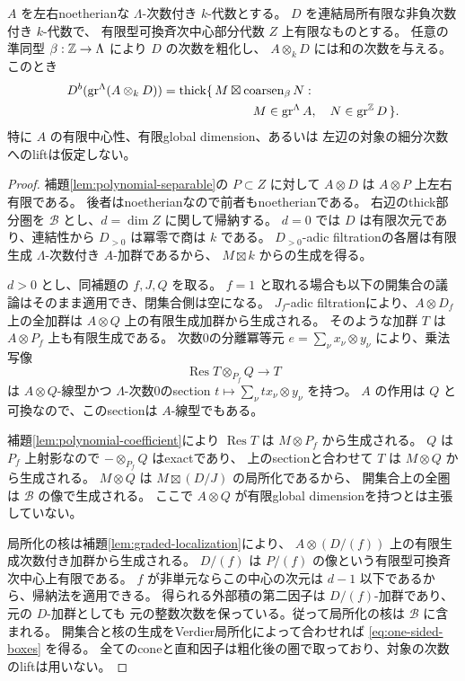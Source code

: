 \begin{theorem}[一方だけが有限中心である外部積生成]\label{thm:one-sided-boxes}
 \(A\) を左右noetherianな \(\Lambda\)-次数付き \(k\)-代数とする。
 \(D\) を連結局所有限な非負次数付き \(k\)-代数で、
 有限型可換斉次中心部分代数 \(Z\) 上有限なものとする。
 任意の準同型 \(\beta:\mathbb Z\to\Lambda\) により \(D\) の次数を粗化し、
 \(A\otimes_kD\) には和の次数を与える。このとき
 \begin{equation}\label{eq:one-sided-boxes}
 \begin{split}
 D^b(\operatorname{gr}^{\Lambda}(A\otimes_kD))
 =\operatorname{thick}\{\,M\boxtimes\operatorname{coarsen}_\beta N:\qquad\qquad\qquad\quad\\
 M\in\operatorname{gr}^{\Lambda}A,\quad
 N\in\operatorname{gr}^{\mathbb Z}D\,\}.
 \end{split}
 \end{equation}
 特に \(A\) の有限中心性、有限global dimension、あるいは
 左辺の対象の細分次数へのliftは仮定しない。
\end{theorem}
\begin{proof}
 補題\ref{lem:polynomial-separable}の \(P\subset Z\) に対して
 \(A\otimes D\) は \(A\otimes P\) 上左右有限である。
 後者はnoetherianなので前者もnoetherianである。
 右辺のthick部分圏を \(\mathcal B\) とし、\(d=\dim Z\) に関して帰納する。
 \(d=0\) では \(D\) は有限次元であり、連結性から \(D_{>0}\) は冪零で商は \(k\) である。
 \(D_{>0}\)-adic filtrationの各層は有限生成 \(\Lambda\)-次数付き \(A\)-加群であるから、
 \(M\boxtimes k\) からの生成を得る。

 \(d>0\) とし、同補題の \(f,J,Q\) を取る。
 \(f=1\) と取れる場合も以下の開集合の議論はそのまま適用でき、閉集合側は空になる。
 \(J_f\)-adic filtrationにより、\(A\otimes D_f\) 上の全加群は
 \(A\otimes Q\) 上の有限生成加群から生成される。
 そのような加群 \(T\) は \(A\otimes P_f\) 上も有限生成である。
 次数0の分離冪等元 \(e=\sum_\nu x_\nu\otimes y_\nu\) により、乗法写像
 \[
 \operatorname{Res}T\otimes_{P_f}Q\longrightarrow T
 \]
 は \(A\otimes Q\)-線型かつ \(\Lambda\)-次数0のsection
 \(t\mapsto\sum_\nu tx_\nu\otimes y_\nu\) を持つ。
 \(A\) の作用は \(Q\) と可換なので、このsectionは \(A\)-線型でもある。

 補題\ref{lem:polynomial-coefficient}により \(\operatorname{Res}T\) は
 \(M\otimes P_f\) から生成される。
 \(Q\) は \(P_f\) 上射影なので \(-\otimes_{P_f}Q\) はexactであり、
 上のsectionと合わせて \(T\) は \(M\otimes Q\) から生成される。
 \(M\otimes Q\) は \(M\boxtimes(D/J)\) の局所化であるから、
 開集合上の全圏は \(\mathcal B\) の像で生成される。
 ここで \(A\otimes Q\) が有限global dimensionを持つとは主張していない。

 局所化の核は補題\ref{lem:graded-localization}により、
 \(A\otimes(D/(f))\) 上の有限生成次数付き加群から生成される。
 \(D/(f)\) は \(P/(f)\) の像という有限型可換斉次中心上有限である。
 \(f\) が非単元ならこの中心の次元は \(d-1\) 以下であるから、帰納法を適用できる。
 得られる外部積の第二因子は \(D/(f)\)-加群であり、元の \(D\)-加群としても
 元の整数次数を保っている。従って局所化の核は \(\mathcal B\) に含まれる。
 開集合と核の生成をVerdier局所化によって合わせれば \eqref{eq:one-sided-boxes} を得る。
 全てのconeと直和因子は粗化後の圏で取っており、対象の次数のliftは用いない。
\end{proof}

